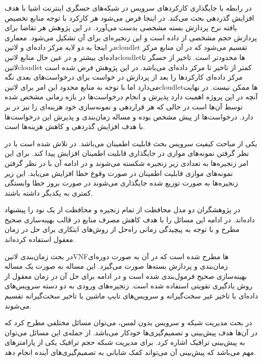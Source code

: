  در رابطه با جایگذاری کارکردهای سرویس در شبکه‌های حسگری اینترنت اشیا با هدف افزایش گذردهی بحث می‌کند. در اینجا فرض می‌شود هر کارکرد با توجه منابع تخصیص یافته نرخ پردازش بسته مشخصی بدست می‌آورد.
در این پژوهش هر تقاضا برای پردازش حجم مشخصی از داده است و این زنجیره‌ای برای آن تشکیل می‌شود. معماری در اینجا به دو لایه مرکز داده‌ای و ‌لاتین{cloudlet} تقسیم می‌شود که در آن منابع مرکز داده‌ای بیشتر
و در عین حال منابع ‌لاتین{cloudlet}ها محدودتر است. تاخیر از حسگر تا ‌لاتین{cloudlet} کمتر از تاخیر تا مرکز داده‌ای می‌باشد. در این پژوهش فرض شده است مرکز داده‌ای کارکردها را بعد از پردازش
در خواست برای درخواست‌های بعدی نگه می‌دارد اما با توجه به منابع محدود این امر برای ‌لاتین{cloudlet}ها ممکن نیست.
در نهایت آنچه در این پروژه اهمیت دارد پذیرش و انجام درخواست‌ها در بازه زمانی مشخص شده توسط آن‌ها است در حالی که هر قراردهی و نمونه‌سازی خود هزینه‌ای را نیز در بر دارد.
درخواست‌ها از پیش مشخص بوده و مساله زمان‌بندی و پذیرش این درخواست‌ها با هدف افزایش گذردهی و کاهش هزینه‌ها است.

یکی از مباحث کیفیت سرویس بحث قابلیت اطمینان می‌باشد. در  تلاش شده است با در نظر گرفتن نمونه‌های موازی در جایگذاری قابلیت اطمینان افزایش پیدا کند. برای این امر زنجیره‌ها به تعدادی زیر زنجیره شکسته می‌شوند
و در ادامه آن با در نظر گرفتن نمونه‌های موازی قابلیت اطمینان در صورت وقوع خطا افزایش می‌یابد. این زیر زنجیره‌ها به صورت توزیع شده جایگذاری می‌شوند در صورت بروز خطا وابستگی کمتری به یکدیگر داشته باشند.

در  پژوهشگران دو مدل محافظت از تمام زنجیره و محافظت از یک نود را پیشنهاد داده‌اند. در ادامه این مسائل را با هدف کاهش مصرف منابع در قالب بهینه‌سازی صحیح مطرح و با توجه به پیچیدگی زمانی راه‌حل از روش‌های
ابتکاری برای حل در زمان معقول استفاده کرده‌اند.

در  بحث زمان‌بندی ‌لاتین{VNF}ها مطرح شده است که در آن به صورت دوره‌ای زمان‌بندی و پردازش بسته‌ها صورت می‌گیرد. این مساله به صورت یک مساله بهینه‌سازی صحیح فرمول‌بندی شده است و در ادامه برای حل آن در زمان معقول
از روش یادگیری تقویتی استفاده شده است. زنجیره‌های ورودی به دو دسته سرویس‌های داده‌ای با تاخیر غیر سخت‌گیرانه و سرویس‌های تایپ ماشین با تاخیر سخت‌گیرانه تقسیم می‌شوند.


در بحث مدیریت شبکه و سرویس بدون لمس، می‌توان مسائل مختلفی مطرح کرد که در آن‌ها هدف پیش‌بینی و تصمیم‌گیری‌ها خودکار می‌باشد. از جمله‌ی این مسائل می‌توان به پیش‌بینی ترافیک اشاره کرد.
برای مدیریت شبکه حجم ترافیک یکی از پارامترهای مهم می‌باشد که پیش‌بینی آن می‌تواند کمک شایانی به تصمیم‌گیری‌های آینده انجام دهد.

